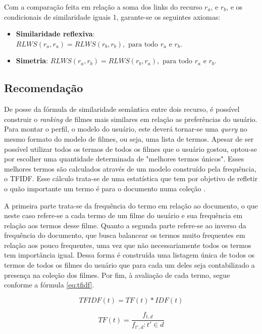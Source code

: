 Com a comparação feita em relação a soma dos links do recurso $r_a$, e $r_b$, e os condicionais de similaridade iguais 1, garante-se os seguintes axiomas:

\begin{itemize}
	\item{\textbf{Similaridade reflexiva}: $RLWS(r_a, r_a) = RLWS(r_b, r_b), \text{ para todo } r_a \text{ e } r_b$.}
	\item{\textbf{Simetria}: $RLWS(r_a, r_b) = RLWS(r_b, r_a), \text{ para todo } r_a \text{ e } r_b$.}
\end{itemize}

\subsection{Recomendação}

De posse da fórmula de similaridade semântica entre dois recurso, é possível construir o \textit{ranking} de filmes mais similares em relação as preferências do usuário. Para montar o perfil, o modelo do usuário, este deverá tornar-se uma \textit{query} no mesmo formato do modelo de filmes, ou seja, uma lista de termos. Apesar de ser possível utilizar todos os termos de todos os filmes que o usuário gostou, optou-se por escolher uma quantidade determinada de "melhores termos únicos". Esses melhores termos são calculados através de um modelo construído pela frequência, o \ac{TFIDF}. Esse cálculo trata-se de uma estatística que tem por objetivo de refletir o quão importante um termo é para o documento numa coleção \citep{rajaraman_ullman_2011}.

A primeira parte trata-se da frequência do termo em relação ao documento, o que neste caso refere-se a cada termo de um filme do usuário e sua frequência em relação aos termos desse filme. Quanto a segunda parte refere-se ao inverso da frequência do documento, que busca balancear os termos muito frequentes em relação aos pouco frequentes, uma vez que não necessariamente todos os termos tem importância igual. Dessa forma é construída uma listagem única de todos os termos de todos os filmes do usuário que para cada um deles seja contabilizado a presença na coleção dos filmes. Por fim, à avaliação de cada termo, segue conforme a fórmula {\ref{eq:tfidf}}.

\begin{equation}
	TFIDF(t) = TF(t) * IDF(t)
\label{eq:tfidf}
\end{equation}

\begin{equation}
	TF(t) = \frac{f_{t,d}}{f_{t',d} : t' \in d}
\label{eq:tf}
\end{equation}

